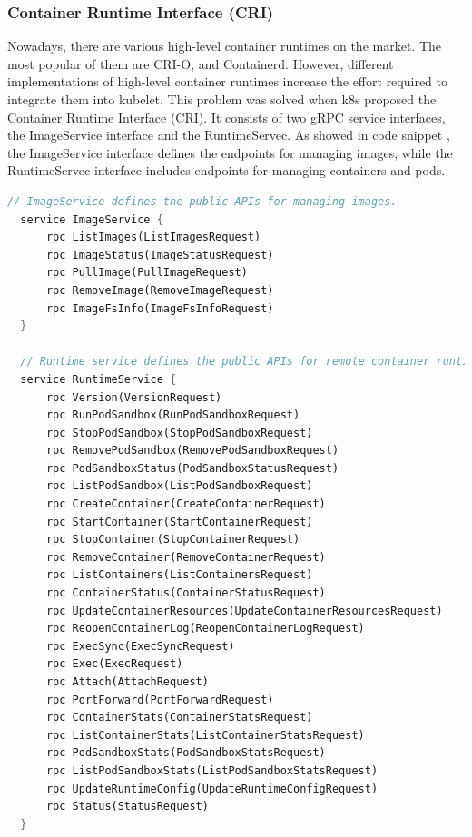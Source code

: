 \subsubsection{Container Runtime Interface (CRI)}
Nowadays, there are various high-level container runtimes on the market. The most popular of them are CRI-O\cite*{cri-o}, and Containerd\cite*{containerd}. However, different implementations of high-level container runtimes increase 
the effort required to integrate them into kubelet. This problem was solved when k8s proposed the Container Runtime Interface (CRI)\cite*{cri-interface}. It consists of two gRPC service interfaces, the ImageService 
interface and the RuntimeServec. As showed in code snippet , the ImageService interface defines the endpoints for managing images, while the RuntimeServec interface includes endpoints for managing containers and pods. 
\begin{lstlisting}[language=rust, basicstyle=\small, caption={Container Runtime Interface (CRI)}, title={Container Runtime Interface (CRI)}, label={CRI_INTERFACE}]
  // ImageService defines the public APIs for managing images.
  service ImageService {
      rpc ListImages(ListImagesRequest) 
      rpc ImageStatus(ImageStatusRequest)
      rpc PullImage(PullImageRequest)
      rpc RemoveImage(RemoveImageRequest)
      rpc ImageFsInfo(ImageFsInfoRequest)
  }

  // Runtime service defines the public APIs for remote container runtimes
  service RuntimeService {
      rpc Version(VersionRequest)
      rpc RunPodSandbox(RunPodSandboxRequest)
      rpc StopPodSandbox(StopPodSandboxRequest)
      rpc RemovePodSandbox(RemovePodSandboxRequest)
      rpc PodSandboxStatus(PodSandboxStatusRequest)
      rpc ListPodSandbox(ListPodSandboxRequest)
      rpc CreateContainer(CreateContainerRequest)
      rpc StartContainer(StartContainerRequest)
      rpc StopContainer(StopContainerRequest)
      rpc RemoveContainer(RemoveContainerRequest)
      rpc ListContainers(ListContainersRequest)
      rpc ContainerStatus(ContainerStatusRequest)
      rpc UpdateContainerResources(UpdateContainerResourcesRequest)
      rpc ReopenContainerLog(ReopenContainerLogRequest)
      rpc ExecSync(ExecSyncRequest)
      rpc Exec(ExecRequest)
      rpc Attach(AttachRequest)
      rpc PortForward(PortForwardRequest)
      rpc ContainerStats(ContainerStatsRequest)
      rpc ListContainerStats(ListContainerStatsRequest)
      rpc PodSandboxStats(PodSandboxStatsRequest)
      rpc ListPodSandboxStats(ListPodSandboxStatsRequest)
      rpc UpdateRuntimeConfig(UpdateRuntimeConfigRequest) 
      rpc Status(StatusRequest)
  }
\end{lstlisting}

